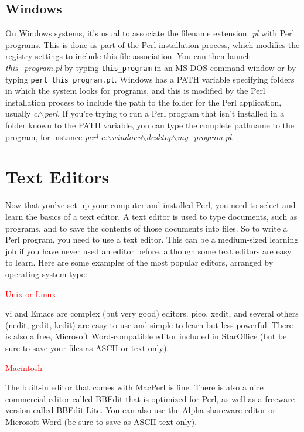 \subsection{Windows}
On Windows systems, it's usual to associate the filename extension \textit{.pl} with Perl programs. This is done as part of the Perl installation process, which modifies the registry settings to include this file association. You can then launch \textit{this\_program.pl} by typing \verb|this_program| in an MS-DOS command window or by typing \verb|perl this_program.pl|. Windows has a PATH variable specifying folders in which the system looks for programs, and this is modified by the Perl installation process to include the path to the folder for the Perl application, usually \textit{c:$\backslash$perl}. If you're trying to run a Perl program that isn't installed in a folder known to the PATH variable, you can type the complete pathname to the program, for instance \textit{perl c:$\backslash$windows$\backslash$desktop$\backslash$my\_program.pl}.

\section{Text Editors}
Now that you've set up your computer and installed Perl, you need to select and learn the basics of a text editor. A text editor is used to type documents, such as programs, and to save the contents of those documents into files. So to write a Perl program, you need to use a text editor. This can be a medium-sized learning job if you have never used an editor before, although some text editors are easy to learn. Here are some examples of the most popular editors, arranged by operating-system type:

\textcolor{red}{Unix or Linux}
\begin{adjustwidth}{1cm}{}
vi and Emacs are complex (but very good) editors. pico, xedit, and several others (nedit, gedit, kedit) are easy to use and simple to learn but less powerful. There is also a free, Microsoft Word-compatible editor included in StarOffice (but be sure to save your files as ASCII or text-only).
\end{adjustwidth}

\textcolor{red}{Macintosh}
\begin{adjustwidth}{1cm}{}
The built-in editor that comes with MacPerl is fine. There is also a nice commercial editor called BBEdit that is optimized for Perl, as well as a freeware version called BBEdit Lite. You can also use the Alpha shareware editor or Microsoft Word (be sure to save as ASCII text only).
\end{adjustwidth}

